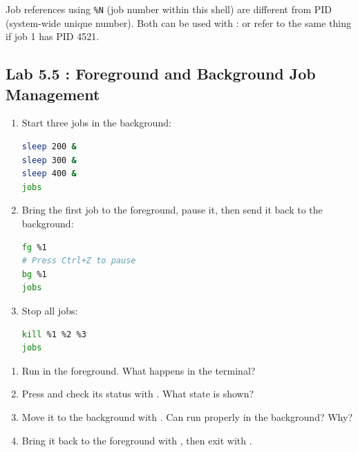 \begin{notebox}
  Job references using \texttt{\%N} (job number within this shell) are
  different from PID (system-wide unique number). Both can be used with
  :  or  refer to the same thing if
  job 1 has PID 4521.
\end{notebox}

\subsection*{Lab 5.5 : Foreground and Background Job Management}

\begin{enumerate}
  \item Start three jobs in the background:
\begin{lstlisting}[language=bash, caption={Creating three background jobs}]
sleep 200 &
sleep 300 &
sleep 400 &
jobs
\end{lstlisting}

  \item Bring the first job to the foreground, pause it, then send it back
    to the background:
\begin{lstlisting}[language=bash, caption={Moving a job between foreground and background}]
fg %1
# Press Ctrl+Z to pause
bg %1
jobs
\end{lstlisting}

  \item Stop all jobs:
\begin{lstlisting}[language=bash, caption={Stopping all jobs}]
kill %1 %2 %3
jobs
\end{lstlisting}
\end{enumerate}

\begin{exercisebox}[5.5]
  \begin{enumerate}
    \item Run  in the foreground. What happens in the terminal?
    \item Press  and check its status with .
      What state is shown?
    \item Move it to the background with . Can  run
      properly in the background? Why?
    \item Bring it back to the foreground with , then exit with
      .
  \end{enumerate}
\end{exercisebox}

